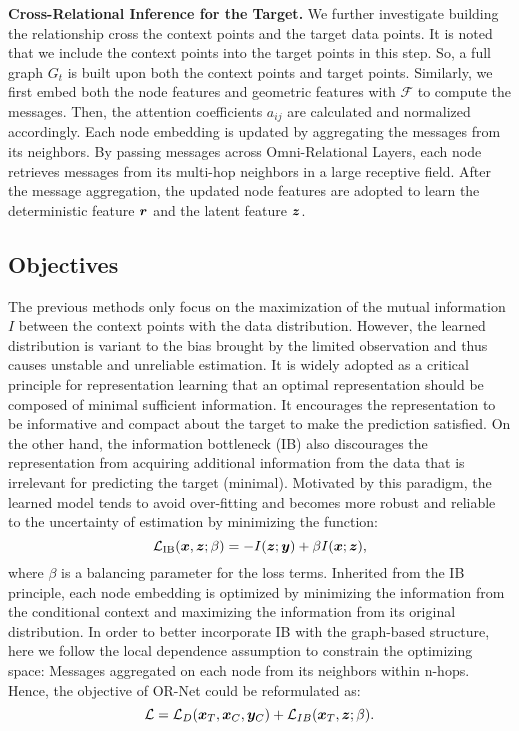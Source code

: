\documentclass[sigconf]{acmart} %
\newcommand{\qy}[1]{\textcolor{blue}{#1}}
\begin{document}
\noindent\textbf{Cross-Relational Inference for the Target.} 
We further investigate building the relationship cross the context points and the target data points. It is noted that we include the context points into the target points in this step. So, a full graph $G_t$ is built upon both the context points and target points.
Similarly, we first embed both the node features and geometric features with $\mathcal{F}$ to compute the messages.
Then, the attention coefficients $a_{ij}$ are calculated and normalized accordingly. Each node embedding is updated by aggregating the messages from its neighbors.
By passing messages across Omni-Relational Layers, each node retrieves messages from its multi-hop neighbors in a large receptive field. After the message aggregation, the updated node features are adopted to learn the deterministic feature ${\bm{r}}$ and the latent feature ${\bm{z}}$.



\subsection{Objectives}

The previous methods only focus on the maximization of the mutual information $I$ between the context points with the data distribution. However, the learned distribution is variant to the bias brought by the limited observation and thus causes unstable and unreliable estimation. 
It is widely adopted as a critical principle for representation learning that an optimal representation should be composed of minimal sufficient information. It encourages the representation to be informative and compact about the target to make the prediction satisfied. On the other hand, the information bottleneck (IB) also discourages the representation from acquiring additional information from the data that is irrelevant for predicting the target (minimal). Motivated by this paradigm, the learned model tends to avoid  over-fitting and becomes more robust and reliable to the uncertainty of estimation by minimizing the function:
\begin{equation}
    \mathcal{L}_{\mathrm{IB}}({\bm{x}},{\bm{z}}; \beta)=-I({\bm{z}}; {\bm{y}})+\beta I({\bm{x}}; {\bm{z}}),
\end{equation}
where $\beta$ is a balancing parameter for the loss terms.
Inherited from the IB principle, each node embedding is optimized by minimizing the information from the conditional context and maximizing the information from its original distribution.
In order to better incorporate IB with the graph-based structure, here we follow the local dependence assumption to constrain the optimizing space: Messages aggregated on each node from its neighbors within n-hops. Hence, the objective of OR-Net could be reformulated as:
\begin{equation}
    \mathcal{L}= \mathcal{L}_D({\bm{x}}_T,{\bm{x}}_C,{\bm{y}}_C) + \mathcal{L}_{IB}({\bm{x}}_T,{\bm{z}}; \beta).
\end{equation}
\end{document}
